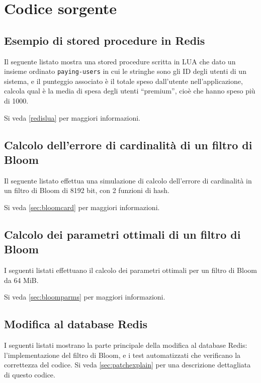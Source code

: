 \chapter{Codice sorgente}

\section{Esempio di stored procedure in Redis}

Il seguente listato mostra una stored procedure scritta in LUA che dato un insieme ordinato
\verb|paying-users| in cui le stringhe sono gli ID degli utenti di un sistema, e il punteggio
associato è il totale speso dall'utente nell'applicazione, calcola qual è la media di spesa degli
utenti ``premium'', cioè che hanno speso più di \SI{1000}{\EUR}.

Si veda \ref{redislua} per maggiori informazioni.



\section{Calcolo dell'errore di cardinalit\`a di un filtro di Bloom}

Il seguente listato effettua una simulazione di calcolo dell'errore di cardinalità in un filtro
di Bloom di 8192 bit, con 2 funzioni di hash.

Si veda \ref{sec:bloomcard} per maggiori informazioni.



\section{Calcolo dei parametri ottimali di un filtro di Bloom}

I seguenti listati effettuano il calcolo dei parametri ottimali per un filtro di Bloom da 64 MiB.

Si veda \ref{sec:bloomparms} per maggiori informazioni.



\section{Modifica al database Redis}
\label{sec:modredis}

I seguenti listati mostrano la parte principale della modifica al database Redis:
l'implementazione del filtro di Bloom, e i test automatizzati che verificano la correttezza
del codice. Si veda \ref{sec:patchexplain} per una descrizione dettagliata di questo codice.

